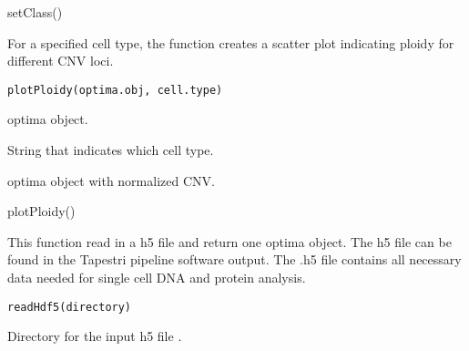 \documentclass[a4paper]{book}
\begin{document}
%
\begin{Examples}
\begin{ExampleCode}
setClass()
\end{ExampleCode}
\end{Examples}
%
\begin{Description}\relax
For a specified cell type, the function creates a scatter plot indicating
ploidy for different CNV loci.
\end{Description}
%
\begin{Usage}
\begin{verbatim}
plotPloidy(optima.obj, cell.type)
\end{verbatim}
\end{Usage}
%
\begin{Arguments}
\begin{ldescription}
\item[\code{optima.obj}] optima object.

\item[\code{cell.type}] String that indicates which cell type.
\end{ldescription}
\end{Arguments}
%
\begin{Value}
optima object with normalized CNV.
\end{Value}
%
\begin{Examples}
\begin{ExampleCode}
plotPloidy()
\end{ExampleCode}
\end{Examples}
%
\begin{Description}\relax
This function read in a h5 file and return one optima object. The
h5 file can be found in the Tapestri pipeline software output. The .h5
file contains all necessary data needed for single cell DNA and protein
analysis.
\end{Description}
%
\begin{Usage}
\begin{verbatim}
readHdf5(directory)
\end{verbatim}
\end{Usage}
%
\begin{Arguments}
\begin{ldescription}
\item[\code{directory}] Directory for the input h5 file .
\end{ldescription}
\end{Arguments}
\end{document}
